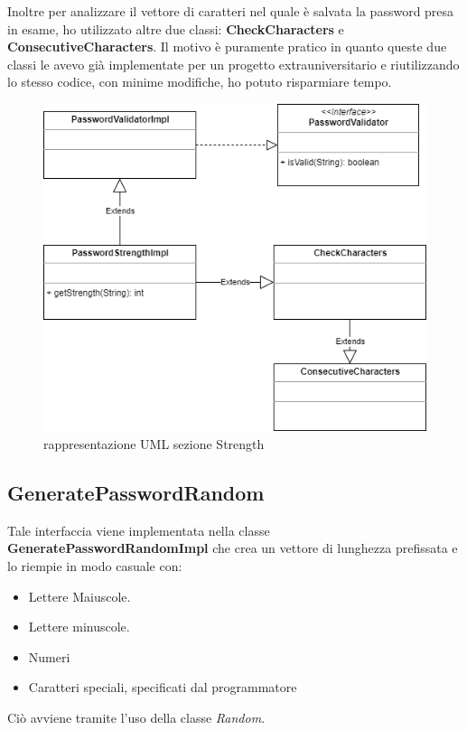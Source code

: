 \documentclass[a4paper,12pt]{report}
\begin{document}
Inoltre per analizzare il vettore di caratteri nel quale è salvata la password presa in esame, ho utilizzato altre due classi: \textbf{CheckCharacters} e \textbf{ConsecutiveCharacters}. Il motivo è puramente pratico in quanto queste due classi le avevo già implementate per un progetto extrauniversitario e riutilizzando lo stesso codice, con minime modifiche, ho potuto risparmiare tempo.
\begin{figure}[h]
\centering{}
\includegraphics[width=\textwidth]{password-strength}
\caption{rappresentazione UML sezione Strength}
\end{figure}

\subsection*{GeneratePasswordRandom}
Tale interfaccia viene implementata nella classe \textbf{GeneratePasswordRandomImpl} che crea un vettore di lunghezza prefissata e lo riempie in modo casuale con:
\begin{itemize}
  \item Lettere Maiuscole.
  \item Lettere minuscole.
  \item Numeri
  \item Caratteri speciali, specificati dal programmatore
\end{itemize}
Ciò avviene tramite l’uso della classe \textit{Random}.\\
\end{document}

